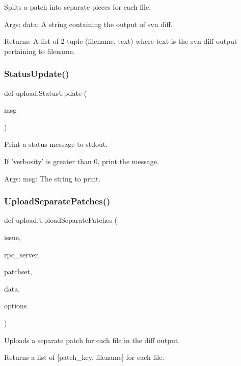 \begin{DoxyVerb}Splits a patch into separate pieces for each file.

Args:
  data: A string containing the output of svn diff.

Returns:
  A list of 2-tuple (filename, text) where text is the svn diff output
    pertaining to filename.
\end{DoxyVerb}
 \mbox{\label{namespaceupload_a79ce84c196c018f3b0c7ff7a9b626b58}} 
\subsubsection{\texorpdfstring{StatusUpdate()}{StatusUpdate()}}
{\footnotesize\ttfamily def upload.\+Status\+Update (\begin{DoxyParamCaption}\item[{}]{msg }\end{DoxyParamCaption})}

\begin{DoxyVerb}Print a status message to stdout.

If 'verbosity' is greater than 0, print the message.

Args:
  msg: The string to print.
\end{DoxyVerb}
 \mbox{\label{namespaceupload_a7ec83cb7f7bfb9109c19b6f91552b3ee}} 
\subsubsection{\texorpdfstring{UploadSeparatePatches()}{UploadSeparatePatches()}}
{\footnotesize\ttfamily def upload.\+Upload\+Separate\+Patches (\begin{DoxyParamCaption}\item[{}]{issue,  }\item[{}]{rpc\+\_\+server,  }\item[{}]{patchset,  }\item[{}]{data,  }\item[{}]{options }\end{DoxyParamCaption})}

\begin{DoxyVerb}Uploads a separate patch for each file in the diff output.

Returns a list of [patch_key, filename] for each file.
\end{DoxyVerb}
 


